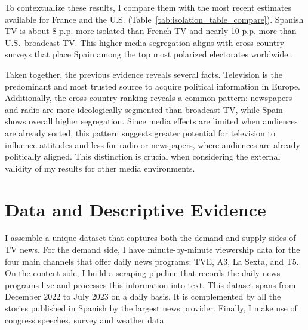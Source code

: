 \documentclass[12pt]{article}
\begin{document}
	
	
To contextualize these results, I compare them with the most recent estimates available for France  \citep{Dejean2022PartisanSE} and the U.S. \citep{gentzkow_isolation} (Table~\ref{tab:isolation_table_compare}). Spanish TV is about 8 p.p. more isolated than French TV and nearly 10 p.p. more than U.S.\ broadcast TV. This higher media segregation aligns with cross-country surveys that place Spain among the top most polarized electorates worldwide \citep{edelman_trust_2023}.
	
	
	
	
	
	
	Taken together, the previous evidence reveals several facts. Television is the predominant and most trusted source to acquire political information in Europe. Additionally, the cross-country ranking reveals a common pattern: newspapers and radio are more ideologically segmented than broadcast TV, while Spain shows overall higher segregation. Since media effects are limited when audiences are already sorted, this pattern suggests greater potential for television to influence attitudes and less for radio or newspapers, where audiences are already politically aligned. This distinction is crucial when considering the external validity of my results for other media environments.
	
	
	

	
	
	\section{Data and Descriptive Evidence}
	\label{sec:data}

	I assemble a unique dataset that captures both the demand and supply sides of TV news. For the demand side, I have minute-by-minute viewership data for the four main channels that offer daily news programs: TVE, A3, La Sexta, and T5. On the content side, I build a scraping pipeline that records the daily news programs live and processes this information into text. This dataset spans from December 2022 to July 2023 on a daily basis. It is complemented by all the stories published in Spanish by the largest news provider. Finally, I make use of congress speeches, survey and weather data.
	
\end{document}
